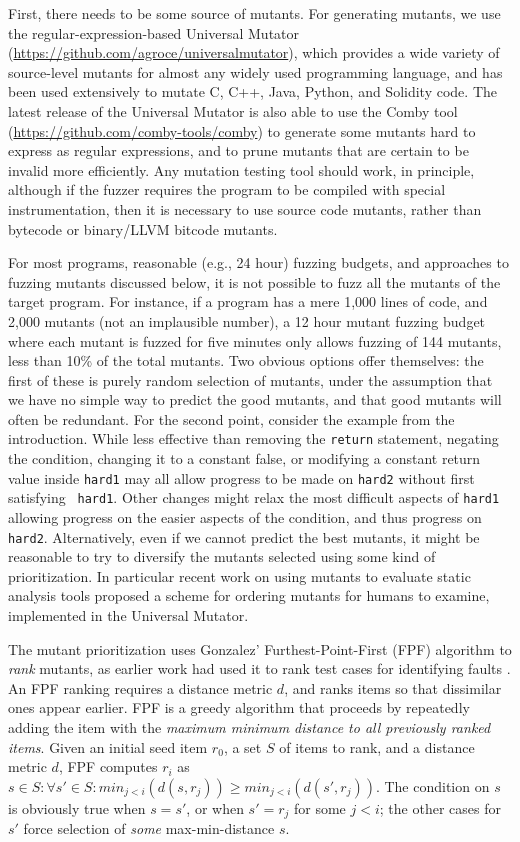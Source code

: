 First, there needs to be some source of mutants.  For generating
mutants, we use the regular-expression-based Universal Mutator
\cite{regexpMut} (\url{https://github.com/agroce/universalmutator}),
which provides a wide variety of source-level mutants for almost any
widely used programming language, and has been used extensively to
mutate C, C++, Java, Python, and Solidity code.  The latest release of
the Universal Mutator is also able to use the Comby \cite{combypaper}
tool (\url{https://github.com/comby-tools/comby}) to generate some
mutants hard to express as regular expressions, and to prune mutants
that are certain to be invalid more efficiently.  Any mutation testing
tool should work, in principle, although if the fuzzer requires the
program to be compiled with special instrumentation, then it is
necessary to use source code mutants, rather than bytecode or
binary/LLVM bitcode mutants.

For most programs, reasonable (e.g., 24 hour) fuzzing budgets, and
approaches to fuzzing mutants discussed below, it is not possible to
fuzz all the mutants of the target program.  For instance, if a
program has a mere 1,000 lines of code, and 2,000 mutants (not an
implausible number), a 12 hour mutant fuzzing budget where each mutant
is fuzzed for five minutes only allows fuzzing of 144 mutants, less
than 10\% of the total mutants.  Two obvious options offer themselves:
the first of these is
purely random selection of mutants, under the assumption that we have
no simple way to predict the good mutants, and that good mutants will
often be redundant.  For the second point, consider the example from
the introduction.  While less effective than removing the {\tt return}
statement, negating the condition, changing it to a constant false, or
modifying a constant return value inside {\tt hard1} may all allow
progress to be made on {\tt hard2} without first satisfying {\tt
  hard1}.  Other changes might relax the most difficult aspects of
{\tt hard1} allowing progress on the easier aspects of the condition,
and thus progress on {\tt hard2}.  Alternatively, even if we cannot
predict the best mutants, it might be reasonable to try to diversify
the mutants selected using some kind of prioritization.  In
particular recent work on using mutants to evaluate static
analysis tools \cite{QRS2021} proposed a scheme for ordering
mutants for humans to examine, implemented in the Universal Mutator.  

The mutant prioritization
uses Gonzalez' Furthest-Point-First \cite{Gonzalez} (FPF) algorithm
to \emph{rank} mutants, as earlier work had used it to rank test cases for identifying faults \cite{PLDI13}.
An
FPF ranking requires a distance metric $d$, and ranks items so that
dissimilar ones appear earlier.  FPF is a
greedy algorithm that proceeds by repeatedly adding the item with the
\emph{maximum minimum distance to all previously ranked items}. Given an
initial seed item $r_0$, a set $S$ of items to rank, and a distance
metric $d$, FPF computes $r_i$ as
$s \in S: \forall s' \in S: min_{ j < i}(d(s,r_j)) \geq min_{j <
  i}(d(s',r_j))$.  The condition on $s$ is obviously true when
$s = s'$, or when $s' = r_j$ for some $j < i$; the other cases for
$s'$ force selection of \emph{some}
max-min-distance $s$.


